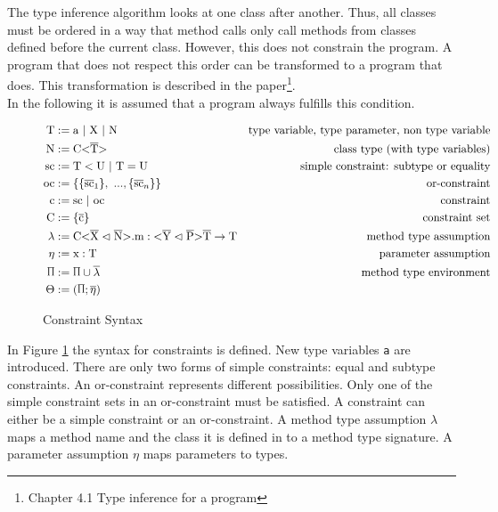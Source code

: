 The type inference algorithm looks at one class after another. Thus, all classes must be ordered in a way that method calls only call methods from classes defined before the current class.
However, this does not constrain the program. A program that does not respect this order can be transformed to a program that does.
This transformation is described in the paper\footnote{Chapter 4.1 Type inference for a program}.
\\
In the following it is assumed that a program always fulfills this condition.

\begin{figure}[tp]
    \begin{align*}
        \text{T} &:= \text{a} \ | \ \text{X} \ | \ \text{N} &\text{type variable, type parameter, non type variable} \\
        \text{N} &:= \text{C} \vv{\ot{T}} &\text{class type (with type variables)}\\
        \text{sc} &:= \text{T} < \text{U} \ | \ \text{T} = \text{U} &\text{simple constraint: subtype or equality}\\
        \text{oc} &:= \{ \{ \ot{sc}_1 \}, \ ..., \{ \ot{sc}_n \} \} &\text{or-constraint}\\
        \text{c} &:= \text{sc} \ | \ \text{oc} &\text{constraint}\\
        \text{C} &:= \{ \ot{c} \} &\text{constraint set}\\
        \lambda &:= \cm : \yp \oto{\text{T}} &\text{method type assumption}\\
        \eta &:= \text{x} : \text{T} &\text{parameter assumption}\\
        \sprod{0.7} &:= \sprod{0.7} \cup \overline{\lambda} &\text{method type environment}\\
        \Theta &:= ( \sprod{0.7}; \overline{\eta} )
    \end{align*}
    \caption{Constraint Syntax}
    \label{constraint_syntax}
\end{figure}

In Figure \ref{constraint_syntax} the syntax for constraints is defined. New type variables \verb|a| are introduced. There are only two forms of simple constraints: equal and subtype constraints. An or-constraint represents different possibilities. Only one of the simple constraint sets in an or-constraint must be satisfied.
A constraint can either be a simple constraint or an or-constraint. A method type assumption $\lambda$ maps a method name and the class it is defined in to a method type signature. A parameter assumption $\eta$ maps parameters to types.

